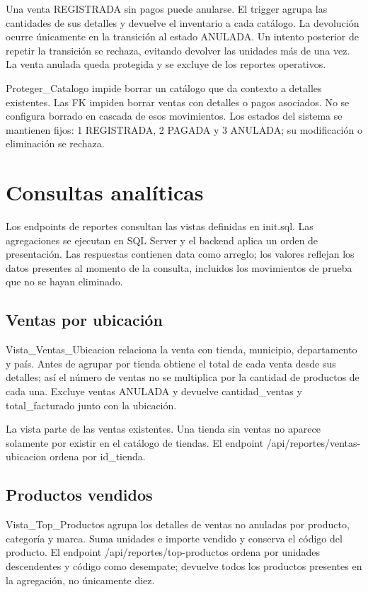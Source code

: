 \documentclass[10pt,letterpaper]{article}
\begin{document}
Una venta REGISTRADA sin pagos puede anularse. El trigger agrupa las cantidades de sus detalles y devuelve el inventario a cada catálogo. La devolución ocurre únicamente en la transición al estado ANULADA. Un intento posterior de repetir la transición se rechaza, evitando devolver las unidades más de una vez. La venta anulada queda protegida y se excluye de los reportes operativos.

Proteger\_Catalogo impide borrar un catálogo que da contexto a detalles existentes. Las FK impiden borrar ventas con detalles o pagos asociados. No se configura borrado en cascada de esos movimientos. Los estados del sistema se mantienen fijos: 1 REGISTRADA, 2 PAGADA y 3 ANULADA; su modificación o eliminación se rechaza.

\section{Consultas analíticas}
Los endpoints de reportes consultan las vistas definidas en init.sql. Las agregaciones se ejecutan en SQL Server y el backend aplica un orden de presentación. Las respuestas contienen data como arreglo; los valores reflejan los datos presentes al momento de la consulta, incluidos los movimientos de prueba que no se hayan eliminado.

\subsection{Ventas por ubicación}
Vista\_Ventas\_Ubicacion relaciona la venta con tienda, municipio, departamento y país. Antes de agrupar por tienda obtiene el total de cada venta desde sus detalles; así el número de ventas no se multiplica por la cantidad de productos de cada una. Excluye ventas ANULADA y devuelve cantidad\_ventas y total\_facturado junto con la ubicación.

La vista parte de las ventas existentes. Una tienda sin ventas no aparece solamente por existir en el catálogo de tiendas. El endpoint /api/reportes/ventas-ubicacion ordena por id\_tienda.

\subsection{Productos vendidos}
Vista\_Top\_Productos agrupa los detalles de ventas no anuladas por producto, categoría y marca. Suma unidades e importe vendido y conserva el código del producto. El endpoint /api/reportes/top-productos ordena por unidades descendentes y código como desempate; devuelve todos los productos presentes en la agregación, no únicamente diez.
\end{document}
